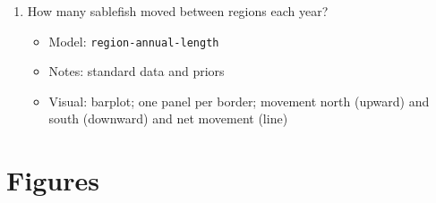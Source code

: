 \documentclass{article}
\begin{document}
\begin{enumerate}
\begin{itemize}
    \end{itemize}
    \item How many sablefish moved between regions each year?
    \begin{itemize}
        \item Model: \texttt{region-annual-length}
        \item Notes: standard data and priors
        \item Visual: barplot; one panel per border; movement north (upward) and south (downward) and net movement (line)
    \end{itemize}
\end{enumerate}


\section{Figures}
\end{document}
